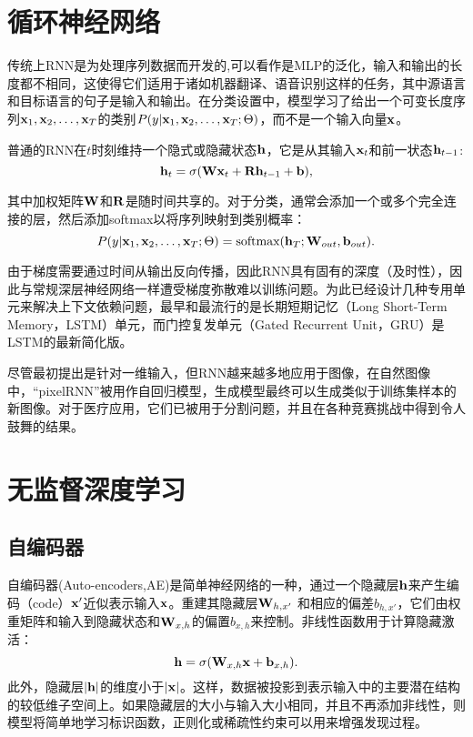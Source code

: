 \section{循环神经网络}
\label{sec:rnns}

传统上RNN是为处理序列数据而开发的,可以看作是MLP的泛化，输入和输出的长度都不相同，这使得它们适用于诸如机器翻译、语音识别这样的任务，其中源语言和目标语言的句子是输入和输出。在分类设置中，模型学习了给出一个可变长度序列${\bf x}_{1}, {\bf x}_{2}, \ldots, {\bf x}_{T}$的类别$P(y | {\bf x}_{1}, {\bf x}_{2}, \ldots, {\bf x}_{T}; \Theta)$，而不是一个输入向量${\bf x}$。

普通的RNN在$t$时刻维持一个隐式或隐藏状态${\bf h} $，它是从其输入${\bf x}_{t}$和前一状态${\bf h}_{t-1}$:
\begin{equation}
 {\bf h}_{t} = \sigma({\bf W}{\bf x}_{t} + {\bf R}{\bf h}_{t - 1} + {\bf b}),
\end{equation}

其中加权矩阵${\bf W}$和${\bf R}$是随时间共享的。对于分类，通常会添加一个或多个完全连接的层，然后添加softmax以将序列映射到类别概率： 
\begin{equation}
 P(y | {\bf x}_{1}, {\bf x}_{2}, \ldots, {\bf x}_{T}; \Theta) = \text{softmax}( {\bf h}_{T}; {\bf W}_{out}, {\bf b}_{out}).
\end{equation}

由于梯度需要通过时间从输出反向传播，因此RNN具有固有的深度（及时性），因此与常规深层神经网络一样遭受梯度弥散难以训练问题。为此已经设计几种专用单元来解决上下文依赖问题，最早和最流行的是长期短期记忆（Long Short-Term Memory，LSTM）单元\citep{Hochreiter1997Long}，而门控复发单元（Gated Recurrent Unit，GRU）\citep{Cho2014Learning}是LSTM的最新简化版。

尽管最初提出是针对一维输入，但RNN越来越多地应用于图像，在自然图像中，“pixelRNN”被用作自回归模型，生成模型最终可以生成类似于训练集样本的新图像。对于医疗应用，它们已被用于分割问题，并且在各种竞赛挑战中得到令人鼓舞的结果\citep{Stollenga2015Parallel}。

\section{无监督深度学习}
\subsection{自编码器}
自编码器(Auto-encoders,AE)是简单神经网络的一种，通过一个隐藏层${\bf h}$来产生编码（code）${\bf x}'$近似表示输入${\bf x}$。重建其隐藏层${\bf W}_{h, x'}$ 和相应的偏差$b_{h, x'}$，它们由权重矩阵和输入到隐藏状态和${\bf W}_{x, h}$的偏置$b_{x, h}$来控制。非线性函数用于计算隐藏激活： 
\begin{equation}
\label{eq::ae_projection}
 {\bf h} = \sigma({\bf W}_{x, h} {\bf x} + {\bf b}_{x, h}).
\end{equation}
此外，隐藏层$|{\bf h}|$的维度小于$|{\bf x}|$。这样，数据被投影到表示输入中的主要潜在结构的较低维子空间上。如果隐藏层的大小与输入大小相同，并且不再添加非线性，则模型将简单地学习标识函数，正则化或稀疏性约束可以用来增强发现过程。


